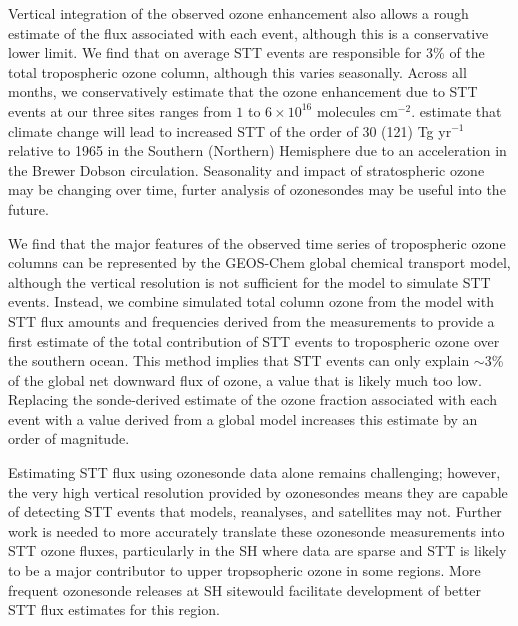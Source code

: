Vertical integration of the observed ozone enhancement also allows a rough estimate of the flux associated with each event, although this is a conservative lower limit.
We find that on average STT events are responsible for 3\% of the total tropospheric ozone column, although this varies seasonally.
Across all months, we conservatively estimate that the ozone enhancement due to STT events at our three sites ranges from $1$ to $6 \times 10^{16}$ molecules cm$^{-2}$.
\citet{Hegglin2009} estimate that climate change will lead to increased STT of the order of 30 (121) Tg yr$^{-1}$ relative to 1965 in the Southern (Northern) Hemisphere due to an acceleration in the Brewer Dobson circulation.
Seasonality and impact of stratospheric ozone may be changing over time, furter analysis of ozonesondes may be useful into the future.


We find that the major features of the observed time series of tropospheric ozone columns can be represented by the GEOS-Chem global chemical transport model, although the vertical resolution is not sufficient for the model to simulate STT events. 
Instead, we combine simulated total column ozone from the model with STT flux amounts and frequencies derived from the measurements to provide a first estimate of the total contribution of STT events to tropospheric ozone over the southern ocean.
This method implies that STT events can only explain $\sim$3\% of the global net downward flux of ozone, a value that is likely much too low. 
Replacing the sonde-derived estimate of the ozone fraction associated with each event with a value derived from a global model \citep{Terao2008} increases this estimate by an order of magnitude.

Estimating STT flux using ozonesonde data alone remains challenging; however, the very high vertical resolution provided by ozonesondes means they are capable of detecting STT events that models, reanalyses, and satellites may not. 
Further work is needed to more accurately translate these ozonesonde measurements into STT ozone fluxes, particularly in the SH where data are sparse and STT is likely to be a major contributor to upper tropsopheric ozone in some regions.
More frequent ozonesonde releases at SH sitewould facilitate development of better STT flux estimates for this region.




